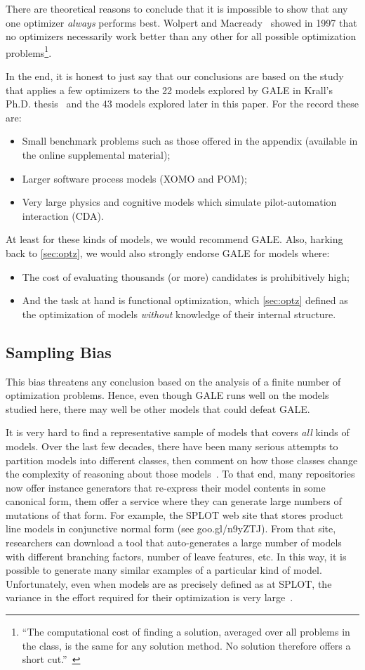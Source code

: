 \documentclass[10pt,journal,compsoc]{IEEEtran}
\newcommand{\bi}{\begin{itemize}}
\newcommand{\ei}{\end{itemize}}
\newcommand{\tion}[1]{\textsection\ref{sec:#1}}
\begin{document}
There are theoretical reasons to conclude that it is impossible
to show that any one optimizer  {\em always} performs best.
Wolpert and Macready~\cite{wolpert97} showed in 1997
that no optimizers necessarily work better than any
other for all possible optimization
problems\footnote{``The computational
  cost of finding a solution, averaged over all
  problems in the class, is the same for any
  solution method.  No solution therefore offers a
  short cut.''~\cite{wolpert97}}. 

In the end, it is honest to just say that our conclusions 
are based on the study that applies a few optimizers to the
22 models explored by GALE in Krall's Ph.D. thesis~\cite{krall14f}
and the 43 models explored later in this paper. For the record these
are:
\bi
\item Small benchmark problems such as those offered in the appendix
(available in the online supplemental material);
\item Larger software process models (XOMO and POM);
\item Very large physics and cognitive models which simulate pilot-automation interaction (CDA).
\ei
At least for these kinds of models, we would recommend GALE.
Also, harking back to \tion{optz}, we would also strongly
endorse GALE for models where:
\bi
\item
The cost of evaluating thousands
(or more)
candidates is prohibitively high;
\item
And the task at hand is functional optimization, which  \tion{optz}
defined as the optimization of models {\em without}  knowledge
of their internal structure.
\ei




\subsection{ Sampling Bias}
This bias threatens any conclusion based on the
analysis of a finite number of optimization
problems.  Hence, even though GALE runs well on
the models studied here, there may well be other
models that could defeat GALE.  

It is very hard to find a representative
sample of models that covers {\em all} kinds of models.
Over the last few decades, there have been many serious attempts
to partition models into different classes, then comment
on how those classes change the complexity of reasoning about those models~\cite{Michie94,Cheeseman91}. To that end, many repositories
now offer instance generators that re-express their model contents
in some canonical form, them offer a service where they can generate
large numbers of mutations of that form. For example, the SPLOT
web site that stores product line models in conjunctive normal form (see goo.gl/n9yZTJ). From that site, researchers can download a tool
that auto-generates a large number of models  with different branching
factors, number of leave features, etc. In this way, it is possible
to generate many similar examples of a particular kind of
model. Unfortunately,  even
when models are as precisely defined as at SPLOT, the variance
in the effort required for their optimization   is  very large~\cite{Hoos02}.
 
\end{document}
